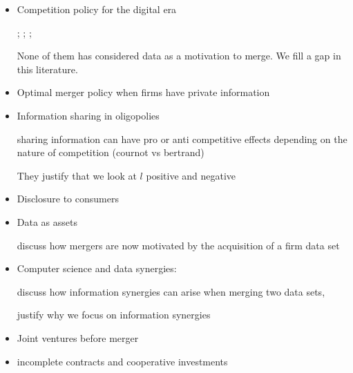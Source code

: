 \documentclass[a4paper,leqno]{article}%
\begin{document}
\begin{itemize}\setlength\itemsep{-1em}

    \item Competition policy for the digital era

    

    \cite{tirole2020competition}; \cite{scott2019committee}; \cite{cremer2019competition}; \cite{cabral2020merger}

    

    None of them has considered data as a motivation to merge. We fill a gap in this literature.

    

    \item Optimal merger policy when firms have private information \cite{Besanko1993}

    \item Information sharing in oligopolies

    

    \cite{vives1984duopoly, gal1986information} sharing information can have pro or anti competitive effects depending on the nature of competition (cournot vs bertrand)

    

    They justify that we look at $l$ positive and negative

    \item Disclosure to consumers 

    \item Data as assets

    

    \cite{stucke2016introduction} discuss how mergers are now motivated by the acquisition of a firm data set

    \item Computer science and data synergies:

    

    \cite{bertschinger2014quantifying, Griffith2014, olbrich2015information} discuss how information synergies can arise when merging two data sets, 

    

    justify why we focus on information synergies

    \item Joint ventures before merger

    \item incomplete contracts and cooperative investments \citep{Che1999}

\end{itemize}
\end{document}
